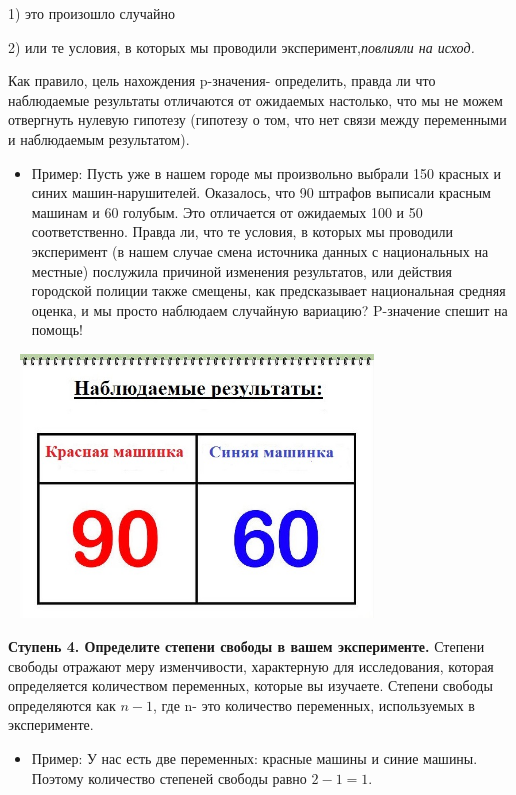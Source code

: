 \documentclass[a4paper,12pt]{article}
\begin{document}
1) это произошло случайно

2) или те условия, в которых мы проводили эксперимент,\em{повлияли} на исход.

Как правило, цель нахождения p-значения- определить, правда ли что наблюдаемые результаты отличаются от ожидаемых настолько, что мы не можем отвергнуть нулевую гипотезу (гипотезу о том, что нет связи между переменными и наблюдаемым результатом).

\begin{itemize}
  \item Пример: Пусть уже в нашем городе мы произвольно выбрали 150 красных и синих машин-нарушителей. Оказалось, что 90 штрафов выписали красным машинам и 60 голубым. Это отличается от ожидаемых 100 и 50 соответственно. Правда ли, что те условия, в которых мы проводили эксперимент (в нашем случае смена источника данных с национальных на местные) послужила причиной изменения результатов, или действия городской полиции также смещены, как предсказывает национальная средняя оценка, и мы просто наблюдаем случайную вариацию? P-значение спешит на помощь!
\end{itemize}

\includegraphics[width=100mm,height=70mm]{2.jpg}

\textbf{Ступень 4. Определите степени свободы в вашем эксперименте.} Степени свободы отражают меру изменчивости, характерную для исследования, которая определяется количеством переменных, которые вы изучаете. Степени свободы определяются как $n-1$, где n- это количество переменных, используемых в эксперименте.

\begin{itemize}
  \item Пример: У нас есть две переменных: красные машины и синие машины. Поэтому количество степеней свободы равно $2-1=1$.
\end{itemize}
\end{document}
